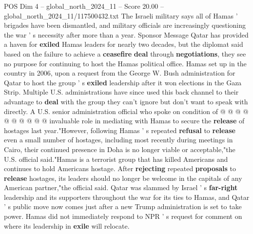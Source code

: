 \begin{textsample}{POS Dim 4 – global\_north\_2024\_11 – Score 20.00 – global\_north\_2024\_11/117500432.txt}
The Israeli military says all of Hamas ' brigades have been dismantled, and military officials are increasingly questioning the war ' s necessity after more than a year.
Sponsor Message Qatar has provided a haven for \textbf{exiled} Hamas leaders for nearly two decades, but the diplomat said based on the failure to achieve a \textbf{ceasefire} \textbf{deal} through \textbf{negotiations}, they see no purpose for continuing to host the Hamas political office.
Hamas set up in the country in 2006, upon a request from the George W.
Bush administration for Qatar to host the group ' s \textbf{exiled} leadership after it won elections in the Gaza Strip.
Multiple U.S. administrations have since used this back channel to their advantage to \textbf{deal} with the group they can't ignore but don't want to speak with directly.
A U.S. senior administration official who spoke on condition of @ @ @ @ @ @ @ @ @ @ invaluable role in mediating with Hamas to secure the \textbf{release} of hostages last year."However, following Hamas ' s repeated \textbf{refusal} to \textbf{release} even a small number of hostages, including most recently during meetings in Cairo, their continued presence in Doha is no longer viable or acceptable,"the U.S. official said."Hamas is a terrorist group that has killed Americans and continues to hold Americans hostage.
After \textbf{rejecting} repeated \textbf{proposals} to \textbf{release} hostages, its leaders should no longer be welcome in the capitals of any American partner,"the official said.
Qatar was slammed by Israel ' s \textbf{far-right} leadership and its supporters throughout the war for its ties to Hamas, and Qatar ' s public move now comes just after a new Trump administration is set to take power.
Hamas did not immediately respond to NPR ' s request for comment on where its leadership in \textbf{exile} will relocate.

\end{textsample}
